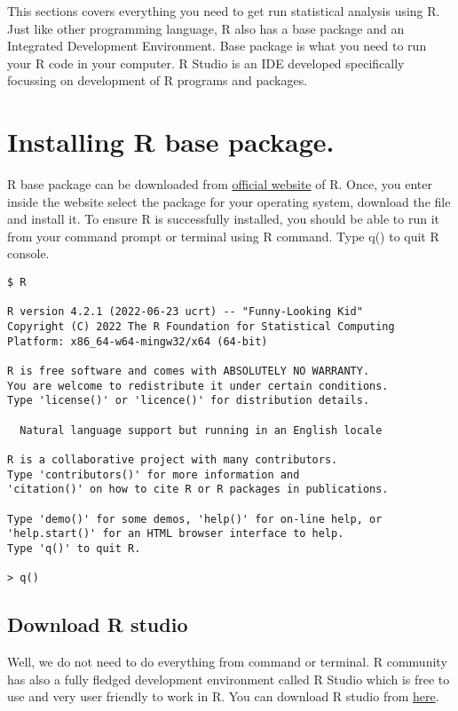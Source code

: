 \documentclass[
]{book}
\begin{document}
This sections covers everything you need to get run statistical analysis using R. Just like other programming language, R also has a base package and an Integrated Development Environment. Base package is what you need to run your R code in your computer. R Studio is an IDE developed specifically focussing on development of R programs and packages.

\hypertarget{installing-r-base-package.}{%
\section{Installing R base package.}\label{installing-r-base-package.}}

R base package can be downloaded from \href{https://cran.r-project.org/}{official website} of R. Once, you enter inside the website select the package for your operating system, download the file and install it. To ensure R is successfully installed, you should be able to run it from your command prompt or terminal using R command. Type q() to quit R console.

\begin{verbatim}
$ R

R version 4.2.1 (2022-06-23 ucrt) -- "Funny-Looking Kid"
Copyright (C) 2022 The R Foundation for Statistical Computing
Platform: x86_64-w64-mingw32/x64 (64-bit)

R is free software and comes with ABSOLUTELY NO WARRANTY.
You are welcome to redistribute it under certain conditions.
Type 'license()' or 'licence()' for distribution details.

  Natural language support but running in an English locale

R is a collaborative project with many contributors.
Type 'contributors()' for more information and
'citation()' on how to cite R or R packages in publications.

Type 'demo()' for some demos, 'help()' for on-line help, or
'help.start()' for an HTML browser interface to help.
Type 'q()' to quit R.

> q()
\end{verbatim}

\hypertarget{download-r-studio}{%
\subsection{Download R studio}\label{download-r-studio}}

Well, we do not need to do everything from command or terminal. R community has also a fully fledged development environment called R Studio which is free to use and very user friendly to work in R. You can download R studio from \href{https://posit.co/download/rstudio-desktop/}{here}.
\end{document}
